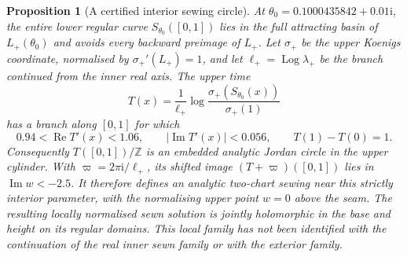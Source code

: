 \documentclass[11pt,a4paper]{article}
\newtheorem{proposition}[theorem]{Proposition}
\theoremstyle{definition}
\newcommand{\ii}{\mathrm{i}}
\begin{document}
\begin{proposition}[A certified interior sewing circle]
\label{prop:interior-sewing-circle}
At $\theta_0=0.1000435842+0.01\ii$, the entire lower regular
curve $S_{\theta_0}([0,1])$ lies in the full attracting basin of
$L_+(\theta_0)$ and avoids every backward preimage of $L_+$.
Let $\sigma_+$ be the upper Koenigs coordinate, normalised by
$\sigma_+'(L_+)=1$, and let
$\ell_+=\operatorname{Log}\lambda_+$ be the branch continued from the inner real
axis.  The upper time
\[
 T(x)=\frac{1}{\ell_+}
 \log\frac{\sigma_+(S_{\theta_0}(x))}{\sigma_+(1)}
\]
has a branch along $[0,1]$ for which
\[
 0.94<\operatorname{Re}T'(x)<1.06,
 \qquad |\operatorname{Im}T'(x)|<0.056,
 \qquad T(1)-T(0)=1.
\]
Consequently $T([0,1])/\mathbb Z$ is an embedded analytic Jordan
circle in the upper cylinder.  With
$\varpi=2\pi\ii/\ell_+$, its shifted image
$(T+\varpi)([0,1])$ lies in $\operatorname{Im}w<-2.5$.
It therefore defines an analytic two-chart sewing near this
strictly interior parameter, with the normalising upper point $w=0$
above the seam.  The resulting locally normalised sewn solution is
jointly holomorphic in the base and height on its regular domains.
This local family has not been identified with the continuation of
the real inner sewn family or with the exterior family.
\end{proposition}
\end{document}
